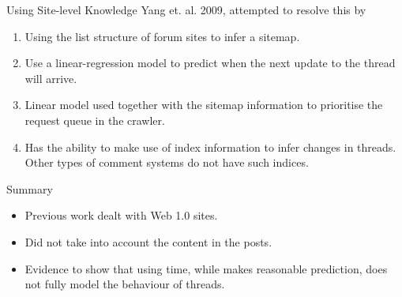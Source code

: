 \documentclass[compress]{beamer}
\begin{document}
\begin{frame}{Using Site-level Knowledge}
Yang et. al. 2009, attempted to resolve this by
	\begin{enumerate}
		\item Using the list structure of forum sites to infer a sitemap.
		\item Use a linear-regression model to predict when the next update to the thread will arrive. %
		\item Linear model used together with the sitemap information to prioritise the request queue in the crawler.
		\item Has the ability to make use of index information to infer changes in threads. Other types of comment systems do not have such indices.
	\end{enumerate}
\end{frame}
\begin{frame}{Summary}
	\begin{itemize}
		\item Previous work dealt with Web 1.0 sites.
		\item Did not take into account the content in the posts.
		\item Evidence to show that using time, while makes reasonable prediction, does not fully model the behaviour of threads.
	\end{itemize}
\end{frame}



\end{document}
